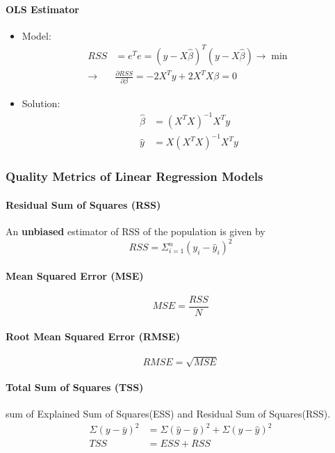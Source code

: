 \paragraph{OLS Estimator} 
\begin{itemize}
	\item Model:
	\begin{align*}
		RSS  &= e^{T} e = (y - X\hat{\beta})^T (y - X\hat{\beta}) \rightarrow \min \\
		\rightarrow  &\frac{\partial RSS}{\partial \beta} = -2X^Ty + 2X^TX\beta= 0
	\end{align*}
	
	\item Solution:
	\begin{align*}
		\hat{\beta} &= (X^TX)^{-1}X^Ty \\ 
		\hat{y} &= X(X^TX)^{-1}X^Ty
	\end{align*}

	


\end{itemize}
\subsubsection{Quality Metrics of Linear Regression Models}
\paragraph{Residual Sum of Squares (RSS)}
An \textbf{unbiased} estimator of RSS of the population is given by 
$$RSS = \Sigma_{i=1}^{n} (y_i - \hat{y}_i)^2$$

\paragraph{Mean Squared Error (MSE)}
$$MSE = \frac{RSS}{N}$$
\paragraph{Root Mean Squared Error (RMSE)}
$$RMSE = \sqrt{MSE}$$
\paragraph{Total Sum of Squares (TSS)} sum of Explained Sum of Squares(ESS) and Residual Sum of Squares(RSS).
\begin{align*}
	\Sigma (y - \bar{y})^2 &= \Sigma (\hat{y} - \bar{y})^2 + \Sigma (y - \hat{y})^2 \\
	TSS &= ESS + RSS
\end{align*}
